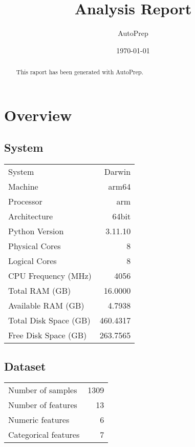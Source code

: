 \documentclass{article}%
\title{Analysis Report}%
\author{AutoPrep}%
\date{\today}%
\begin{document}
%
\normalsize%
\maketitle%

                \begin{abstract}
                This raport has been generated with AutoPrep.
                \end{abstract}
\tableofcontents%
\newpage%
\section{Overview}%
\label{sec:Overview}%

%
\subsection{System}%
\label{subsec:System}%

%


\begin{table}[H]%
\begin{center}%
\begin{tabular}{l r}%
\hline%
System&Darwin\\%
Machine&arm64\\%
Processor&arm\\%
Architecture&64bit\\%
Python Version&3.11.10\\%
Physical Cores&8\\%
Logical Cores&8\\%
CPU Frequency (MHz)&4056\\%
Total RAM (GB)&16.0000\\%
Available RAM (GB)&4.7938\\%
Total Disk Space (GB)&460.4317\\%
Free Disk Space (GB)&263.7565\\%
\hline%
\end{tabular}%
\end{center}%
\end{table}

%
\subsection{Dataset}%
\label{subsec:Dataset}%

%


\begin{table}[H]%
\begin{center}%
\begin{tabular}{l r}%
\hline%
Number of samples&1309\\%
Number of features&13\\%
Numeric features&6\\%
Categorical features&7\\%
\hline%
\end{tabular}%
\end{center}%
\end{table}
\end{document}
